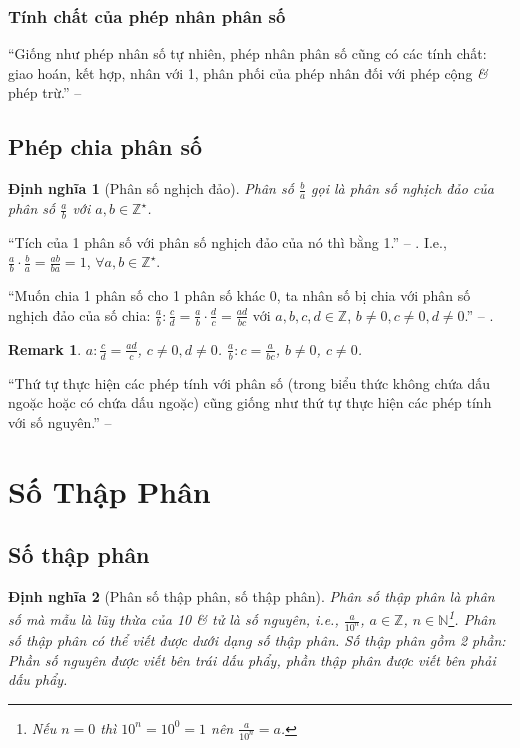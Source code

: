 \documentclass[oneside]{book}
\numberwithin{equation}{section}
\newtheorem{dinhnghia}{Định nghĩa}[section]
\newtheorem{remark}{Remark}[section]
\begin{document}
\subsubsection{Tính chất của phép nhân phân số}
``Giống như phép nhân số tự nhiên, phép nhân phân số cũng có các tính chất: giao hoán, kết hợp, nhân với 1, phân phối của phép nhân đối với phép cộng \textit{\&} phép trừ.'' -- \cite[p. 41]{Thai_Anh_Dat_Ha_Loan_Nam_Quang_Toan_6_tap_2}

\subsection{Phép chia phân số}
 
\begin{dinhnghia}[Phân số nghịch đảo]
	Phân số $\frac{b}{a}$ gọi là \emph{phân số nghịch đảo} của phân số $\frac{a}{b}$ với $a,b\in\mathbb{Z}^\star$.
\end{dinhnghia}
``Tích của 1 phân số với phân số nghịch đảo của nó thì bằng 1.'' -- \cite[p. 42]{Thai_Anh_Dat_Ha_Loan_Nam_Quang_Toan_6_tap_2}. I.e., $\frac{a}{b}\cdot\frac{b}{a} = \frac{ab}{ba} = 1$, $\forall a,b\in\mathbb{Z}^\star$.

``Muốn chia 1 phân số cho 1 phân số khác 0, ta nhân số bị chia với phân số nghịch đảo của số chia: $\frac{a}{b}:\frac{c}{d} = \frac{a}{b}\cdot\frac{d}{c} = \frac{ad}{bc}$ với $a,b,c,d\in\mathbb{Z}$, $b\ne 0,c\ne 0,d\ne 0$.'' -- \cite[p. 42]{Thai_Anh_Dat_Ha_Loan_Nam_Quang_Toan_6_tap_2}.

\begin{remark}
	$a:\frac{c}{d} = \frac{ad}{c}$, $c\ne 0,d\ne 0$. $\frac{a}{b}:c = \frac{a}{bc}$, $b\ne 0$, $c\ne 0$.
\end{remark}
``Thứ tự thực hiện các phép tính với phân số (trong biểu thức không chứa dấu ngoặc hoặc có chứa dấu ngoặc) cũng giống như thứ tự thực hiện các phép tính với số nguyên.'' -- \cite[p. 42]{Thai_Anh_Dat_Ha_Loan_Nam_Quang_Toan_6_tap_2}

\section{Số Thập Phân}

\subsection{Số thập phân}

\begin{dinhnghia}[Phân số thập phân, số thập phân]
	\emph{Phân số thập phân} là phân số mà mẫu là lũy thừa của 10 \textit{\&} tử là số nguyên, i.e., $\frac{a}{10^n}$, $a\in\mathbb{Z}$, $n\in\mathbb{N}$\footnote{Nếu $n = 0$ thì $10^n = 10^0 = 1$ nên $\frac{a}{10^n} = a$.}. Phân số thập phân có thể viết được dưới dạng số thập phân. Số thập phân gồm 2 phần: \emph{Phần số nguyên} được viết bên trái dấu phẩy, \emph{phần thập phân} được viết bên phải dấu phẩy.
\end{dinhnghia}
\end{document}
